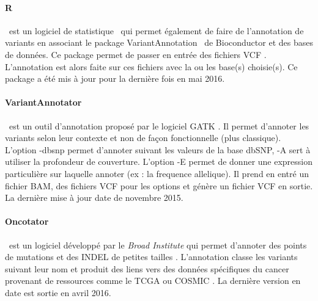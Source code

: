 \paragraph{R} ~est un logiciel de statistique \citep{R} ~qui permet également de faire de l'annotation de variants en associant le package \og VariantAnnotation \fg ~de Bioconductor et des bases de données. Ce package permet de passer en entrée des fichiers VCF \citep{Rpack}. L'annotation est alors faite sur ces fichiers avec la  ou les base(s) choisie(s). Ce package a été mis à jour pour la dernière fois en mai 2016.

\paragraph{VariantAnnotator} ~est un outil d'annotation proposé par le logiciel GATK \citep{GATK}. Il permet d'annoter les variants selon leur contexte et non de façon fonctionnelle (plus classique). L'option -dbsnp permet d'annoter suivant les valeurs de la base dbSNP, -A sert à utiliser la profondeur de couverture. L'option -E permet de donner une expression particulière sur laquelle annoter (ex : la \gls{frequence allelique}). Il prend en entré un fichier BAM, des fichiers VCF pour les options et génère un fichier VCF en sortie. La dernière mise à jour date de novembre 2015.

\paragraph{Oncotator} ~est un logiciel développé par le \textit{Broad Institute} qui permet d'annoter des points de mutations et des INDEL de petites tailles \citep{oncotator}. L'annotation classe les variants suivant leur nom et produit des liens vers des données spécifiques du cancer provenant de ressources comme le TCGA \citep{TCGA} ou COSMIC \citep{cosmic}. La dernière version en date est sortie en avril 2016.